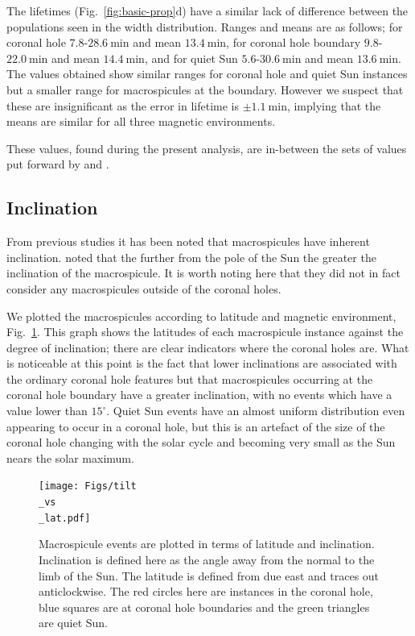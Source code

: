 The lifetimes (Fig.~\ref{fig:basic-prop}d) have a similar lack of difference between the populations seen in the width distribution. Ranges and means are as follows; for coronal hole $7.8$-$28.6\ \textrm{min}$ and mean $13.4\ \textrm{min}$, for coronal hole boundary $9.8$-$22.0\ \textrm{min}$ and mean $14.4\ \textrm{min}$, and for quiet Sun $5.6$-$30.6\ \textrm{min}$ and mean $13.6\ \textrm{min}$. The values obtained show similar ranges for coronal hole and quiet Sun instances but a smaller range for macrospicules at the boundary. However we suspect that these are insignificant as the error in lifetime is $\pm1.1\ \textrm{min}$, implying that the means are similar for all three magnetic environments.

These values, found during the present analysis, are in-between the sets of values put forward by \cite{Bohlin1975} and \cite{Dere89}.

\subsection{Inclination} 
From previous studies it has been noted that macrospicules have inherent inclination. \cite{Bohlin1975} noted that the further from the pole of the Sun the greater the inclination of the macrospicule. It is worth noting here that they did not in fact consider any macrospicules outside of the coronal holes. 

We plotted the macrospicules according to latitude and magnetic environment, Fig.~\ref{fig:tilt-lat}. This graph shows the latitudes of each macrospicule instance against the degree of inclination; there are clear indicators where the coronal holes are. What is noticeable at this point is the fact that lower inclinations are associated with the ordinary coronal hole features but that macrospicules occurring at the coronal hole boundary have a greater inclination, with no events which have a value lower than $15^{\circ}$. Quiet Sun events have an almost uniform distribution even appearing to occur in a coronal hole, but this is an artefact of the size of the coronal hole changing with the solar cycle and becoming very small as the Sun nears the solar maximum. 


\begin{figure}[t!]
	\centering
	\texttt{[image: Figs/tilt\\\_vs\\\_lat.pdf]}	
	\caption{\small Macrospicule events are plotted in terms of latitude and inclination. Inclination is defined here as the angle away from the normal to the limb of the Sun. The latitude is defined from due east and traces out anticlockwise. The red circles here are instances in the coronal hole, blue squares are at coronal hole boundaries and the green triangles are quiet Sun.}
	\label{fig:tilt-lat}
\end{figure}


